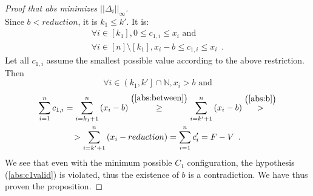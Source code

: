 \begin{proof}[Proof that abs minimizes $||\Delta_i||_{\infty}$]
\begin{equation*}
  \end{equation*}
  Since $b < reduction$, it is $k_1 \leq k'$. It is:
  \begin{equation*}
  \begin{gathered}
    \forall i \in [k_1], 0 \leq c_{1, i} \leq x_i \mbox{ and} \\
    \forall i \in [n] \setminus [k_1], x_i - b \leq c_{1, i} \leq x_i \enspace.
  \end{gathered}
  \end{equation*}
  Let all $c_{1, i}$ assume the smallest possible value according to the above restriction. Then
  \begin{equation}
  \label{abs:between}
    \forall i \in \left(k_1, k'\right] \cap \mathbb{N}, x_i > b \mbox{ and}
  \end{equation}
  \begin{equation*}
  \begin{gathered}
    \sum\limits_{i=1}^nc_{1, i} = \sum\limits_{i=k_1+1}^n\left(x_i - b\right) \overset{\left(\ref{abs:between}\right)}{\geq}
    \sum\limits_{i=k'+1}^n\left(x_i - b\right) \overset{\left(\ref{abs:b}\right)}{>} \\
    > \sum\limits_{i=k'+1}^n\left(x_i - reduction\right) = \sum\limits_{i=1}^nc'_i = F - V \enspace.
  \end{gathered}
  \end{equation*}
  We see that even with the minimum possible $C_1$ configuration, the hypothesis (\ref{abs:c1valid}) is violated, thus the
  existence of $b$ is a contradiction. We have thus proven the proposition.
\end{proof}
